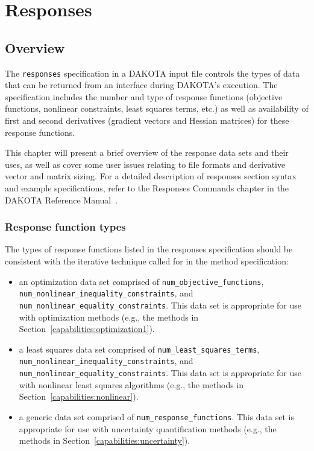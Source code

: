 \chapter{Responses}\label{responses}

\section{Overview}\label{responses:overview}

The \texttt{responses} specification in a DAKOTA input file controls
the types of data that can be returned from an interface during
DAKOTA's execution. The specification includes the number and type of
response functions (objective functions, nonlinear constraints, least
squares terms, etc.) as well as availability of first and second
derivatives (gradient vectors and Hessian matrices) for these response
functions.

This chapter will present a brief overview of the response data sets
and their uses, as well as cover some user issues relating to file
formats and derivative vector and matrix sizing. For a detailed
description of responses section syntax and example specifications,
refer to the Responses Commands chapter in the DAKOTA Reference
Manual~\cite{RefMan}.

\subsection{Response function types}\label{responses:overview:types}

The types of response functions listed in the responses
specification should be consistent with the
iterative technique called for in the method specification:

\begin{itemize}

\item an optimization data set comprised of
  \texttt{num\_objective\_functions},\\
  \texttt{num\_nonlinear\_inequality\_constraints}, and
  \texttt{num\_nonlinear\_equality\_constraints}.  This data set is
  appropriate for use with optimization methods (e.g., the methods in
  Section~\ref{capabilities:optimization1}).
  
\item a least squares data set comprised of 
  \texttt{num\_least\_squares\_terms},\\
  \texttt{num\_nonlinear\_inequality\_constraints}, and
  \texttt{num\_nonlinear\_equality\_constraints}.  This data set is
  appropriate for use with nonlinear least squares algorithms
  (e.g., the methods in Section~\ref{capabilities:nonlinear}).
  
\item a generic data set comprised of \texttt{num\_response\_functions}.  
  This data set is appropriate for use with uncertainty quantification
  methods (e.g., the methods in Section~\ref{capabilities:uncertainty}).
  
\end{itemize}

